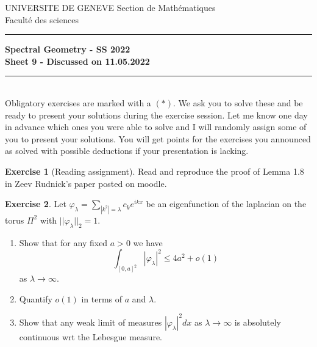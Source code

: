 \documentclass[a4paper,11pt]{article}
\theoremstyle{definition}
\newtheorem{exercise}{Exercise}
\begin{document}
\pagestyle{headings}
\noindent UNIVERSITE DE GENEVE \hfill Section de Mathématiques\\
\noindent Facult\'e des sciences \hfill \\[-3mm]
\hrule

\large

\begin{center}
\textbf{Spectral Geometry - SS 2022 \\ Sheet 9 - Discussed on 11.05.2022}
\end{center}
\hrule
\text{}\\[1cm]

Obligatory exercises are marked with a $(*)$. We ask you to solve these and be ready to present your solutions during the exercise session. Let me know one day in advance which ones you were able to solve and I will randomly assign some of you to present your solutions. You will get points for the exercises you announced as solved with possible deductions if your presentation is lacking.

\begin{exercise}[Reading assignment]
	Read and reproduce the proof of Lemma 1.8 in Zeev Rudnick's paper posted on moodle.
\end{exercise}

\begin{exercise}
	Let $\varphi_\lambda = \sum_{|k^2| = \lambda} c_k e^{ikx}$ be an eigenfunction of the laplacian on the torus $\Pi^2$ with $||\varphi_\lambda||_2 = 1$. 
	\begin{enumerate}
		\item Show that for any fixed $a > 0$ we have 
		\[\int_{[0,a]^2} |\varphi_\lambda|^2 \leq 4 a^2 + o(1) \]
		as $\lambda \to \infty$.
		\item Quantify $o(1)$ in terms of $a$ and $\lambda$.
		\item Show that any weak limit of measures $|\varphi_\lambda|^2 dx$ as $\lambda\to\infty$ is absolutely continuous wrt the Lebesgue measure.  
	\end{enumerate}
\end{exercise}
\end{document}
